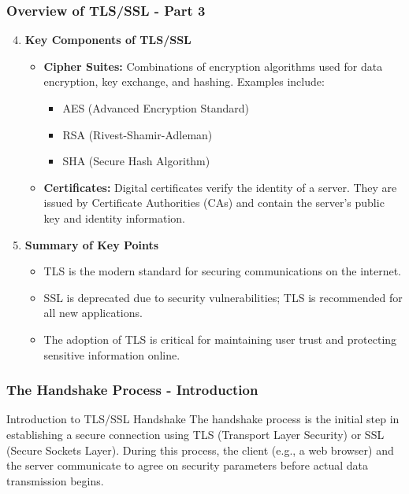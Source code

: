 \documentclass{beamer}
\begin{document}
\begin{frame}[fragile]
    \frametitle{Overview of TLS/SSL - Part 3}
    \begin{enumerate}
        \setcounter{enumi}{3} %
        \item \textbf{Key Components of TLS/SSL}
            \begin{itemize}
                \item \textbf{Cipher Suites:} Combinations of encryption algorithms used for data encryption, key exchange, and hashing. Examples include:
                    \begin{itemize}
                        \item AES (Advanced Encryption Standard)
                        \item RSA (Rivest-Shamir-Adleman)
                        \item SHA (Secure Hash Algorithm)
                    \end{itemize}
                \item \textbf{Certificates:} Digital certificates verify the identity of a server. They are issued by Certificate Authorities (CAs) and contain the server's public key and identity information.
            \end{itemize}

        \item \textbf{Summary of Key Points}
            \begin{itemize}
                \item TLS is the modern standard for securing communications on the internet.
                \item SSL is deprecated due to security vulnerabilities; TLS is recommended for all new applications.
                \item The adoption of TLS is critical for maintaining user trust and protecting sensitive information online.
            \end{itemize}
    \end{enumerate}
\end{frame}

\begin{frame}[fragile]
    \frametitle{The Handshake Process - Introduction}
    \begin{block}{Introduction to TLS/SSL Handshake}
        The handshake process is the initial step in establishing a secure connection using TLS (Transport Layer Security) or SSL (Secure Sockets Layer). 
        During this process, the client (e.g., a web browser) and the server communicate to agree on security parameters before actual data transmission begins.
    \end{block}
\end{frame}
\end{document}
